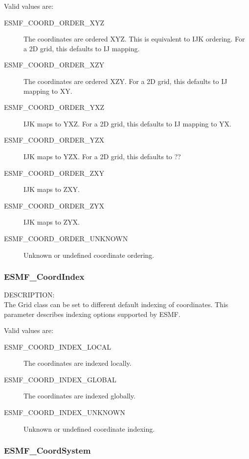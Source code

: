Valid values are:
\begin{description}
   \item [ESMF\_COORD\_ORDER\_XYZ]
         The coordinates are ordered XYZ.  This is equivalent to IJK ordering.
         For a 2D grid, this defaults to IJ mapping.

   \item [ESMF\_COORD\_ORDER\_XZY]
         The coordinates are ordered XZY.  For a 2D grid, this defaults to IJ 
         mapping to XY.

   \item [ESMF\_COORD\_ORDER\_YXZ]
         IJK maps to YXZ.  For a 2D grid, this defaults to IJ mapping to YX.

   \item [ESMF\_COORD\_ORDER\_YZX]
         IJK maps to YZX.  For a 2D grid, this defaults to ??

   \item [ESMF\_COORD\_ORDER\_ZXY]
         IJK maps to ZXY.

   \item [ESMF\_COORD\_ORDER\_ZYX]
         IJK maps to ZYX.

   \item [ESMF\_COORD\_ORDER\_UNKNOWN]
         Unknown or undefined coordinate ordering.
\end{description}

\subsubsection{ESMF\_CoordIndex}

{\sf DESCRIPTION:\\}
The Grid class can be set to different default indexing of coordinates.  This
parameter describes indexing options supported by ESMF.

Valid values are:
\begin{description}
   \item [ESMF\_COORD\_INDEX\_LOCAL]
         The coordinates are indexed locally.  

   \item [ESMF\_COORD\_INDEX\_GLOBAL]
         The coordinates are indexed globally.

   \item [ESMF\_COORD\_INDEX\_UNKNOWN]
         Unknown or undefined coordinate indexing.
\end{description}

\subsubsection{ESMF\_CoordSystem}

